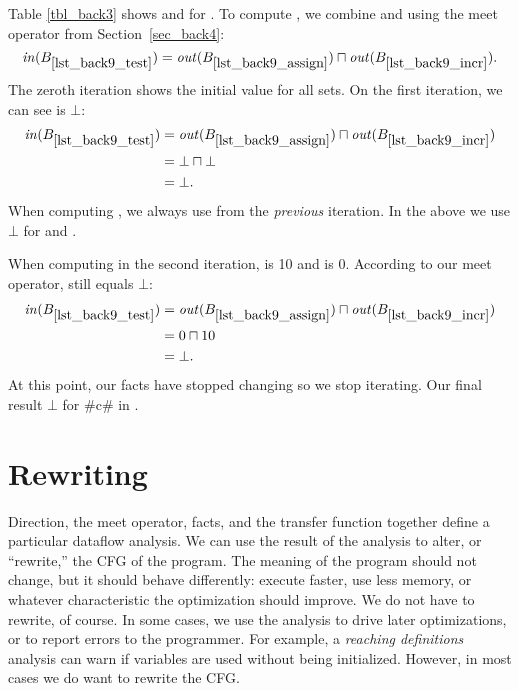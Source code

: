 \documentclass[12pt]{report}
\begin{document}
Table \ref{tbl_back3} shows \inE and \out for
. To compute , we combine
 and  using the meet
operator from Section~\ref{sec_back4}:
\begin{equation}
  \inB{lst_back9_test} = \outB{lst_back9_assign} \lub \outB{lst_back9_incr}.
\end{equation}
The zeroth iteration shows the initial
value for all sets. On the first iteration, we can see  is $\bot$:
\begin{equation}
  \begin{split}
    \inB{lst_back9_test} &= \outB{lst_back9_assign} \lub \outB{lst_back9_incr} \\
    &= \bot \lub \bot \\
    &= \bot.
  \end{split}
\end{equation}
When computing \inBa, we always use \outBa from the
\emph{previous} iteration. In the above we use $\bot$ for  and
. 

When computing  in the second iteration,
 is 10 and  is
0. According to our meet operator,  still equals
$\bot$:
\begin{equation}
  \begin{split}
    \inB{lst_back9_test} &= \outB{lst_back9_assign} \lub \outB{lst_back9_incr} \\
    &= 0 \lub 10 \\
    &= \bot.
  \end{split}
\end{equation}
At this point, our facts have stopped changing so we stop
iterating. Our final result $\bot$ for #c# in .

\section{Rewriting}
\label{sec_back7}


Direction, the meet operator, facts, and the transfer function
together define a particular dataflow analysis. We can use the result
of the analysis to alter, or ``rewrite,'' the CFG of the program. The
meaning of the program should not change, but it should behave
differently: execute faster, use less memory, or whatever
characteristic the optimization should improve.  We do not have to
rewrite, of course. In some cases, we use the analysis to drive later
optimizations, or to report errors to the programmer. For example, a
\emph{reaching definitions} \citep{AhoXX} analysis can warn if
variables are used without being initialized. However, in most cases
we do want to rewrite the CFG.
\end{document}
